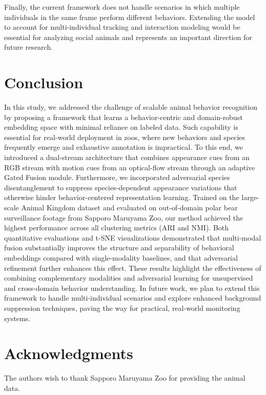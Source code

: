 \documentclass[fleqn,10pt,twocolumn]{AROB}
\begin{document}
Finally, the current framework does not handle scenarios in which multiple individuals in the same frame perform different behaviors. Extending the model to account for multi-individual tracking and interaction modeling would be essential for analyzing social animals and represents an important direction for future research.


\section{Conclusion}\label{sec:conclusion} 
In this study, we addressed the challenge of scalable animal behavior recognition by proposing a framework that learns a behavior-centric and domain-robust embedding space with minimal reliance on labeled data. Such capability is essential for real-world deployment in zoos, where new behaviors and species frequently emerge and exhaustive annotation is impractical. To this end, we introduced a dual-stream architecture that combines appearance cues from an RGB stream with motion cues from an optical-flow stream through an adaptive Gated Fusion module. Furthermore, we incorporated adversarial species disentanglement to suppress species-dependent appearance variations that otherwise hinder behavior-centered representation learning. Trained on the large-scale Animal Kingdom dataset and evaluated on out-of-domain polar bear surveillance footage from Sapporo Maruyama Zoo, our method achieved the highest performance across all clustering metrics (ARI and NMI). Both quantitative evaluations and t-SNE visualizations demonstrated that multi-modal fusion substantially improves the structure and separability of behavioral embeddings compared with single-modality baselines, and that adversarial refinement further enhances this effect. These results highlight the effectiveness of combining complementary modalities and adversarial learning for unsupervised and cross-domain behavior understanding. In future work, we plan to extend this framework to handle multi-individual scenarios and explore enhanced background suppression techniques, paving the way for practical, real-world monitoring systems.


\section*{Acknowledgments}

The authors wish to thank Sapporo Maruyama Zoo for providing the animal data.


 
\end{document}
